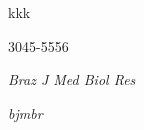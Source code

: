 \documentclass[10pt,a4paper]{article}
\begin{document}
\printtitle 
\printauthor

kkk

3045-5556

      \renewenvironment{journalmeta}{\begin{tcolorbox}}{\end{tcolorbox}}
             \renewcommand{\journalidtypenlmstyle}{\itshape}
             \renewcommand{\journalidtypenlm}[1]{{\journalidtypenlmstyle #1}}
             \renewcommand{\journalidtypeublisheridstyle}{\itshape}
             \renewcommand{\journalidtypeublisherid}[1]{{\journalidtypeublisheridstyle #1}}

      \begin{journalmeta}
            \journalidtypenlm{Braz J Med Biol Res}

            \journalidtypeublisherid{bjmbr}

      
      \end{journalmeta}

%
\end{document}
